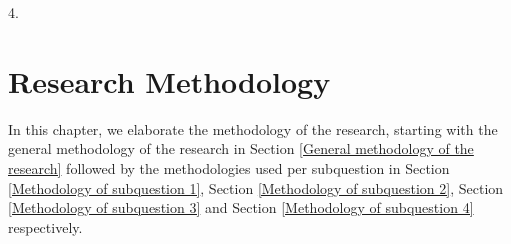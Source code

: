 \documentclass[12pt]{scrreprt}
\begin{document}
\begin{flushleft}
4. \textit{\sqfour}
\end{flushleft}

\chapter{Research Methodology}
\label{Research Methodology}
In this chapter, we elaborate the methodology of the research, starting with the general methodology of the research in Section \ref{General methodology of the research} followed by the methodologies used per subquestion in Section \ref{Methodology of subquestion 1}, Section \ref{Methodology of subquestion 2}, Section \ref{Methodology of subquestion 3} and Section \ref{Methodology of subquestion 4} respectively.
\end{document}
